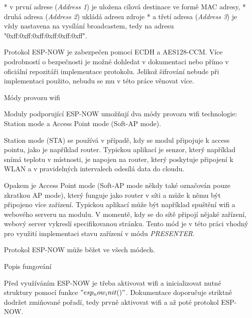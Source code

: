 \begitems
* v první adrese ({\em Address 1}) je uložena cílová destinace ve formě MAC adresy,
* druhá adresa ({\em Address 2}) ukládá adresu zdroje
* a třetí adresa ({\em Address 3}) je vždy nastavena na vysílání broadcastem, tedy na adresu "0xff:0xff:0xff:0xff:0xff:0xff".
\enditems

Protokol ESP-NOW je zabezpečen pomocí ECDH a AES128-CCM. Více podrobností o bezpečnosti je možné dohledat v dokumentaci  nebo přímo v oficiální repozitáři implementace protokolu. Jelikož šifrování nebude při implementaci použito, nebudu se mu v této práce věnovat více.

\secc Módy provozu wifi

Moduly podporující ESP-NOW umožňují dva módy provozu wifi technologie: Station mode a Access Point mode (Soft-AP mode).

{\sbf Station mode} (STA) se používá v případě, kdy se modul připojuje k access pointu, jako je například router. Typickou aplikací je senzor, který například snímá teplotu v místnosti, je napojen na router, který poskytuje připojení k WLAN a v pravidelných intervalech odesílá data do cloudu.

Opakem je {\sbf Access Point mode} (Soft-AP mode někdy také označován pouze zkratkou AP mode), který funguje jako router v síti a může k němu být připojeno více zařízení. Typickou aplikací může být například spuštění wifi a webového serveru na modulu. V momentě, kdy se do sítě připojí nějaké zařízení, webový server vykreslí specifikovanou stránku.
Tento mód je v této práci vhodný pro využití implementaci stavu zařízení v módu {\em PRESENTER}.

Protokol ESP-NOW může běžet ve všech módech.

\secc Popis fungování

Před využíváním ESP-NOW je třeba aktivovat wifi a {\sbf inicializovat} nutné struktury pomocí funkce $"esp_now_init()"$. Dokumentace doporučuje striktně dodržet zmiňované pořadí, tedy prvně aktivovat wifi a až poté protokol ESP-NOW.

